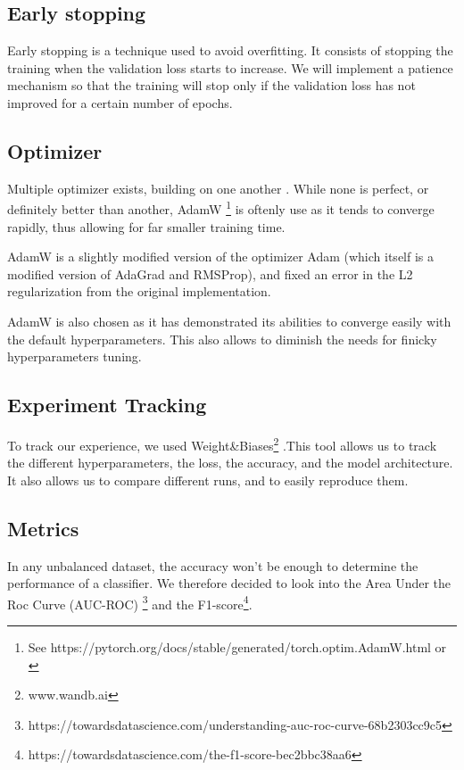 \documentclass[11pt]{article}
\begin{document}
    \subsection{Early stopping}

        Early stopping is a technique used to avoid overfitting. It consists of stopping the training when the validation loss starts to increase. We will
        implement a patience mechanism so that the training will stop only if the validation loss has not improved for a certain number of epochs.
    \subsection{Optimizer}

        Multiple optimizer exists, building on one another . While none is perfect, or definitely better than another, AdamW \footnote{See https://pytorch.org/docs/stable/generated/torch.optim.AdamW.html or \cite{adamw}} is oftenly use as it tends
        to converge rapidly, thus allowing for far smaller training time.

        AdamW is a slightly modified version of the optimizer Adam (which itself is a modified version of AdaGrad and RMSProp), and fixed an error in the L2 regularization from the original implementation.

        AdamW is also chosen as it has demonstrated its abilities to converge easily with the default hyperparameters. This also allows to diminish the needs for finicky hyperparameters tuning.


    \subsection{Experiment Tracking}
        To track our experience, we used Weight\&Biases\footnote{www.wandb.ai} .This tool allows us to track the different hyperparameters,
        the loss, the accuracy, and the model architecture. It also allows us to compare different runs, and to easily reproduce them.
    \subsection{Metrics}
        In any unbalanced dataset, the accuracy won't be enough to determine the performance of a classifier.
        We therefore decided to look into the Area Under the Roc Curve (AUC-ROC) \footnote{https://towardsdatascience.com/understanding-auc-roc-curve-68b2303cc9c5}
        and the F1-score\footnote{https://towardsdatascience.com/the-f1-score-bec2bbc38aa6}.
\end{document}
